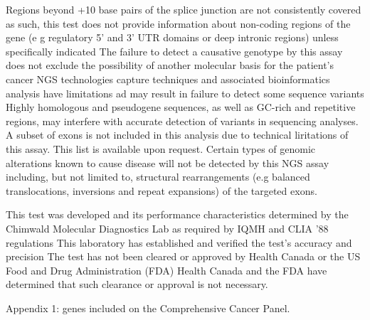 \documentclass[8pt,letterpaper]{extarticle}
\newcommand{\data}[1]{}
\begin{document}
{Regions beyond +10 base pairs of the splice junction are not consistently covered as such, this test does not provide information about non-coding regions of the gene (e g regulatory 5' and 3' UTR domains or deep intronic regions) unless specifically indicated The failure to detect a causative genotype by this assay does not exclude the possibility of another molecular basis for the patient's cancer NGS technologies capture techniques and associated bioinformatics analysis have limitations ad may result in failure to detect some sequence variants  Highly homologous and pseudogene sequences, as well as GC-rich and repetitive regions, may interfere with accurate detection of variants in sequencing analyses. A subset of exons is not included in this analysis due to technical liritations of this assay. This list is available upon request.   Certain types of genomic alterations known to cause disease will not be detected by this NGS assay including, but not limited to, structural rearrangements (e.g balanced translocations, inversions and repeat expansions) of the targeted exons.

This test was developed and its performance characteristics determined by the Chimwald Molecular Diagnostics Lab as required by IQMH and CLIA '88 regulations This laboratory has established and verified the test's accuracy and precision The test has not been cleared or approved by Health Canada or the US Food and Drug Administration (FDA) Health Canada and the FDA have determined that such clearance or approval is not necessary.
}

Appendix 1: \data{num_tested_genes} genes included on the Comprehensive Cancer Panel. 
\end{document}
